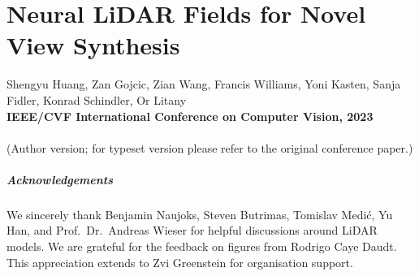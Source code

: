 \chapter[Neural LiDAR Fields for Novel View Synthesis]{Neural LiDAR Fields for Novel View Synthesis}
\label{chap:iccv23}

Shengyu Huang, Zan Gojcic, Zian Wang, Francis Williams, Yoni Kasten, Sanja Fidler, Konrad Schindler, Or Litany\\
\textbf{IEEE/CVF International Conference on Computer Vision, 2023}\\
\\
(Author version; for typeset version please refer to the original conference paper.)\\

\providecommand{\subdir}{.}
\graphicspath{{\subdir/}}


\newpage







\paragraph{Acknowledgements}
{We sincerely thank Benjamin Naujoks, Steven Butrimas, Tomislav Medić, Yu Han, and Prof.~Dr.~Andreas Wieser for helpful discussions around LiDAR models. We are grateful for the feedback on figures from Rodrigo Caye Daudt. This appreciation extends to Zvi Greenstein for organisation support.}


\newpage
\newcommand{\manuallabel}[2]{\def\@currentlabel{#2}\label{#1}}
\makeatother
\manuallabel{eq:loss_function}{Eq.~(15)}

